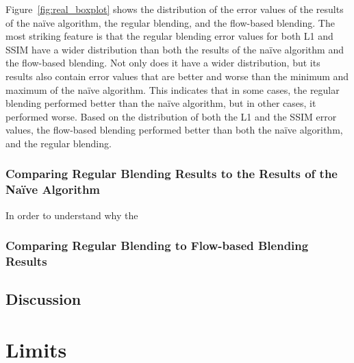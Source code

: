 Figure~\ref{fig:real_boxplot} shows the distribution of the error values of the results of the na\"ive algorithm, the regular blending, and the flow-based blending. The most striking feature is that the regular blending error values for both L1 and SSIM have a wider distribution than both the results of the na\"ive algorithm and the flow-based blending. Not only does it have a wider distribution, but its results also contain error values that are better and worse than the minimum and maximum of the na\"ive algorithm. This indicates that in some cases, the regular blending performed better than the na\"ive algorithm, but in other cases, it performed worse. Based on the distribution of both the L1 and the SSIM error values, the flow-based blending performed better than both the na\"ive algorithm, and the regular blending.

\subsubsection{Comparing Regular Blending Results to the Results of the Na\"ive Algorithm}
In order to understand why the 

\subsubsection{Comparing Regular Blending to Flow-based Blending Results}

\subsection{Discussion}


\section{Limits}

